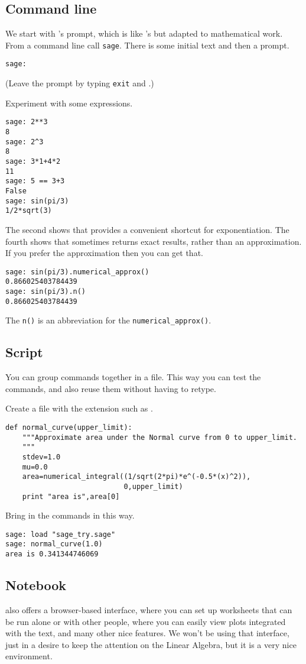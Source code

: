 \subsection{Command line}
We start with \sage's prompt, which is like \python's but adapted to 
mathematical work.
From a command line call \lstinline[style=inline]!sage!.
There is some initial text and then a prompt.
\begin{lstlisting}[style=python]
sage:  
\end{lstlisting}
(Leave the prompt by typing \lstinline[style=inline]!exit!
and .)

Experiment with some expressions.
\begin{lstlisting}[style=python]
sage: 2**3                                                                           
8
sage: 2^3
8
sage: 3*1+4*2
11
sage: 5 == 3+3
False
sage: sin(pi/3)
1/2*sqrt(3)
\end{lstlisting}
The second shows that \sage{} provides a convenient shortcut for exponentiation.
The fourth shows that \sage{} sometimes returns exact results, rather than an
approximation.
If you prefer the approximation then you can get that. 
\begin{lstlisting}[style=python]
sage: sin(pi/3).numerical_approx()
0.866025403784439
sage: sin(pi/3).n()
0.866025403784439  
\end{lstlisting}
The \lstinline[style=inline]!n()! is an abbreviation for the
\lstinline[style=inline]!numerical_approx()!.


\subsection{Script}
You can group \sage{} commands together in a file.
This way you can test the commands, 
and also reuse them without having to retype.

Create a file with the extension  such as .
\begin{lstlisting}[style=python]
def normal_curve(upper_limit):
    """Approximate area under the Normal curve from 0 to upper_limit.
    """
    stdev=1.0
    mu=0.0
    area=numerical_integral((1/sqrt(2*pi)*e^(-0.5*(x)^2)),
                            0,upper_limit)    
    print "area is",area[0]
\end{lstlisting}
Bring in the commands in this way.
\begin{lstlisting}[style=python]
sage: load "sage_try.sage"
sage: normal_curve(1.0)   
area is 0.341344746069  
\end{lstlisting}


\subsection{Notebook}
\sage{} also offers a browser-based interface, where you can set up
worksheets that can be run alone or with other people, where you can easily
view plots integrated with the text, and many other nice features.
We won't be using that interface, just in a desire to keep the attention
on the Linear Algebra, but it is a very nice environment. 
\endinput